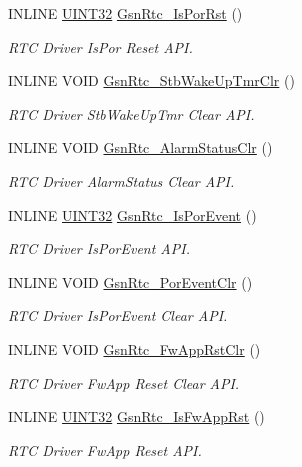 \begin{DoxyCompactItemize}
INLINE \hyperlink{a00660_gae1e6edbbc26d6fbc71a90190d0266018}{UINT32} \hyperlink{a00651_gae89e16f4b3c227c10f40a7ad9bf7f37a}{GsnRtc\_\-IsPorRst} ()
\begin{DoxyCompactList}\small\item\em RTC Driver IsPor Reset API. \end{DoxyCompactList}\item 
INLINE VOID \hyperlink{a00651_ga2813f8a6b6eb71b15d51405f92c9e65a}{GsnRtc\_\-StbWakeUpTmrClr} ()
\begin{DoxyCompactList}\small\item\em RTC Driver StbWakeUpTmr Clear API. \end{DoxyCompactList}\item 
INLINE VOID \hyperlink{a00651_gaa52a7c31e385f908bda2607f4d069696}{GsnRtc\_\-AlarmStatusClr} ()
\begin{DoxyCompactList}\small\item\em RTC Driver AlarmStatus Clear API. \end{DoxyCompactList}\item 
INLINE \hyperlink{a00660_gae1e6edbbc26d6fbc71a90190d0266018}{UINT32} \hyperlink{a00651_gaa9261c1d12f3040818e2b433f1d9643e}{GsnRtc\_\-IsPorEvent} ()
\begin{DoxyCompactList}\small\item\em RTC Driver IsPorEvent API. \end{DoxyCompactList}\item 
INLINE VOID \hyperlink{a00651_ga4ccf506d6700a1107e70eb8044f6cc22}{GsnRtc\_\-PorEventClr} ()
\begin{DoxyCompactList}\small\item\em RTC Driver IsPorEvent Clear API. \end{DoxyCompactList}\item 
INLINE VOID \hyperlink{a00651_ga7bf5618aa3aa43eb2dccc62f1c66cd37}{GsnRtc\_\-FwAppRstClr} ()
\begin{DoxyCompactList}\small\item\em RTC Driver FwApp Reset Clear API. \end{DoxyCompactList}\item 
INLINE \hyperlink{a00660_gae1e6edbbc26d6fbc71a90190d0266018}{UINT32} \hyperlink{a00651_gaa5d760275a8669e3b861bee05767cd26}{GsnRtc\_\-IsFwAppRst} ()
\begin{DoxyCompactList}\small\item\em RTC Driver FwApp Reset API. \end{DoxyCompactList}\item 

\end{DoxyCompactItemize}
